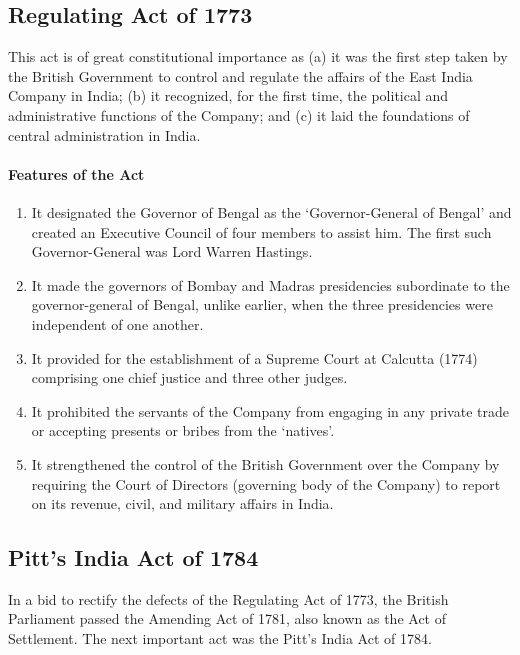\subsection{Regulating Act of 1773}
This act is of great constitutional importance as (a) it was the first step taken by the British Government to control and regulate the affairs of the East India Company in India; (b) it recognized, for the first time, the political and administrative functions of the Company; and (c) it laid the foundations of central administration in India.

\paragraph{Features of the Act}

\begin{enumerate}
  \item It designated the Governor of Bengal as the `Governor-General of Bengal' and created an Executive Council of four members to assist him. The first such Governor-General was Lord Warren Hastings.
  \item It made the governors of Bombay and Madras presidencies subordinate to the governor-general of Bengal, unlike earlier, when the three presidencies were independent of one another.
  \item It provided for the establishment of a Supreme Court at Calcutta (1774) comprising one chief justice and three other judges.
  \item It prohibited the servants of the Company from engaging in any private trade or accepting presents or bribes from the `natives'.
  \item It strengthened the control of the British Government over the Company by requiring the Court of Directors (governing body of the Company) to report on its revenue, civil, and military affairs in India.
\end{enumerate}

\subsection{Pitt's India Act of 1784}

In a bid to rectify the defects of the Regulating Act of 1773, the British Parliament passed the Amending Act of 1781, also known as the Act of Settlement. The next important act was the Pitt's India Act of 1784.

